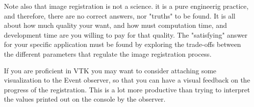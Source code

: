 Note also that image registration is not a science. it is a pure
engineerig practice, and therefore, there are no correct answers,
nor "truths" to be found. It is all about how much quality your want,
and how must computation time, and development time are you
willing to pay for that quality. The "satisfying" answer for your
specific application must be found by exploring the trade-offs
between the different parameters that regulate the image
registration process.

If you are proficient in VTK you may want to consider attaching
some visualization to the Event observer, so that you can have
a visual feedback on the progress of the registration. This is a
lot more productive than trying to interpret the values printed
out on the console by the observer.

